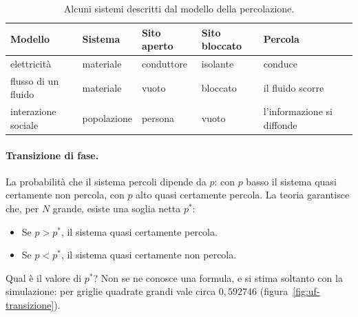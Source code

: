 \begin{table}[htbp]
\centering
\small
\begin{tabular}{lllll}
\toprule
Modello & Sistema & Sito aperto & Sito bloccato & Percola \\
\midrule
elettricità & materiale & conduttore & isolante & conduce \\
flusso di un fluido & materiale & vuoto & bloccato & il fluido scorre \\
interazione sociale & popolazione & persona & vuoto & l'informazione si diffonde \\
\bottomrule
\end{tabular}
\caption{Alcuni sistemi descritti dal modello della percolazione.}
\label{tab:uf-modelli}
\end{table}

\paragraph{Transizione di fase.}
La probabilità che il sistema percoli dipende da $p$: con $p$ basso il sistema quasi certamente non percola, con $p$ alto quasi certamente percola. La teoria garantisce che, per $N$ grande, esiste una soglia netta $p^*$:
\begin{itemize}
    \item Se $p > p^*$, il sistema quasi certamente percola.
    \item Se $p < p^*$, il sistema quasi certamente non percola.
\end{itemize}

Qual è il valore di $p^*$? Non se ne conosce una formula, e si stima soltanto con la simulazione: per griglie quadrate grandi vale circa $0{,}592746$ (figura~\ref{fig:uf-transizione}).


